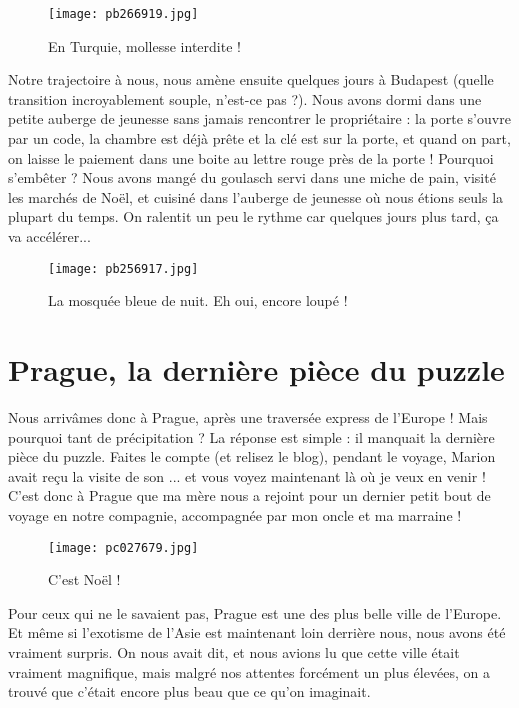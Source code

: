 \documentclass{book}
\begin{document}
\begin{figure}[h]
\centering
\texttt{[image: pb266919.jpg]}
\caption*{En Turquie, mollesse interdite !}
\end{figure}

Notre trajectoire à nous, nous amène ensuite quelques jours à Budapest (quelle transition incroyablement souple, n'est-ce pas ?). Nous avons dormi dans une petite auberge de jeunesse sans jamais rencontrer le propriétaire : la porte s'ouvre par un code, la chambre est déjà prête et la clé est sur la porte, et quand on part, on laisse le paiement dans une boite au lettre rouge près de la porte ! Pourquoi s'embêter ? Nous avons mangé du goulasch servi dans une miche de pain, visité les marchés de Noël, et cuisiné dans l'auberge de jeunesse où nous étions seuls la plupart du temps. On ralentit un peu le rythme car quelques jours plus tard, ça va accélérer...


\begin{figure}[h]
\centering
\texttt{[image: pb256917.jpg]}
\caption*{La mosquée bleue de nuit. Eh oui, encore loupé !}
\end{figure}





\chapter{Prague, la dernière pièce du puzzle}
Nous arrivâmes donc à Prague, après une traversée express de l'Europe ! Mais pourquoi tant de précipitation ? La réponse est simple : il manquait la dernière pièce du puzzle. Faites le compte (et relisez le blog), pendant le voyage, Marion avait reçu la visite de son ... et vous voyez maintenant là où je veux en venir ! C'est donc à Prague que ma mère nous a rejoint pour un dernier petit bout de voyage en notre compagnie, accompagnée par mon oncle et ma marraine !


\begin{figure}[h]
\centering
\texttt{[image: pc027679.jpg]}
\caption*{C'est Noël !}
\end{figure}

Pour ceux qui ne le savaient pas, Prague est une des plus belle ville de l'Europe. Et même si l'exotisme de l'Asie est maintenant loin derrière nous, nous avons été vraiment surpris. On nous avait dit, et nous avions lu que cette ville était vraiment magnifique, mais malgré nos attentes forcément un plus élevées, on a trouvé que c'était encore plus beau que ce qu'on imaginait.
\end{document}
